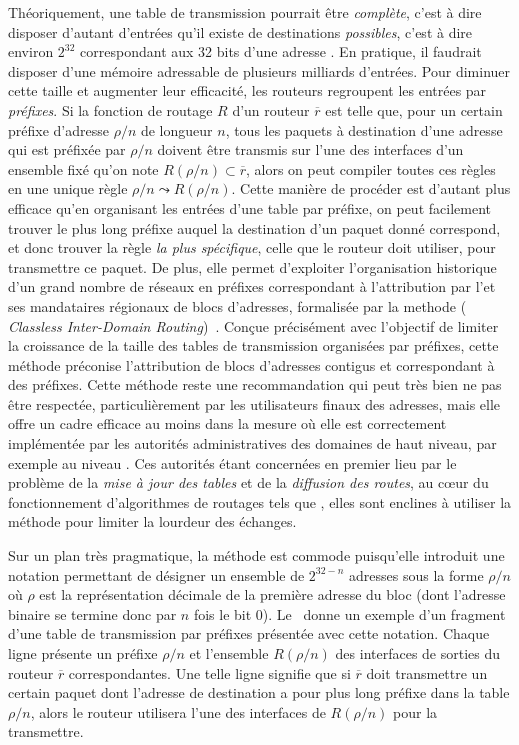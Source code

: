 Théoriquement, une table de transmission pourrait être {\em complète}, c'est à
dire disposer d'autant d'entrées qu'il existe de destinations {\em possibles},
c'est à dire environ $2^{32}$ correspondant aux 32 bits d'une adresse \ip. En
pratique, il faudrait disposer d'une mémoire adressable de plusieurs milliards
d'entrées. Pour diminuer cette taille et augmenter leur efficacité, les routeurs
regroupent les entrées par {\em préfixes}. Si la fonction de routage $R$ d'un
routeur $\overline{r}$ est telle que, pour un certain préfixe d'adresse $\rho/n$
de longueur $n$, tous les paquets à destination d'une adresse qui est préfixée
par $\rho/n$ doivent être transmis sur l'une des interfaces d'un ensemble fixé
qu'on note $R(\rho/n) \subset \overline{r}$, alors on peut compiler toutes ces
règles en une unique règle $\rho/n \leadsto R(\rho/n)$.
Cette manière de procéder est d'autant plus efficace qu'en organisant les
entrées d'une table par préfixe, on peut facilement trouver le plus long préfixe
auquel la destination d'un paquet donné correspond, et donc trouver la règle
{\em la plus spécifique}, celle que le routeur doit utiliser, pour transmettre
ce paquet. De plus, elle permet d'exploiter l'organisation historique d'un grand
nombre de réseaux en préfixes correspondant à l'attribution par l'\iana et ses
mandataires régionaux de blocs d'adresses, formalisée par la methode \cidr ({\em
Classless Inter-Domain Routing})~\cite{rfc1517,rfc1518,rfc1519,rfc4632}. Conçue
précisément avec l'objectif de limiter la croissance de la taille des tables de
transmission organisées par préfixes, cette méthode préconise l'attribution de
blocs d'adresses contigus et correspondant à des préfixes. Cette méthode reste
une recommandation qui peut très bien ne pas être respectée, particulièrement
par les utilisateurs finaux des adresses, mais elle offre un cadre efficace au
moins dans la mesure où elle est correctement implémentée par les autorités
administratives des domaines de haut niveau, par exemple au niveau \as. Ces
autorités étant concernées en premier lieu par le problème de la {\em mise à
jour des tables} et de la {\em diffusion des routes}, au c\oe{}ur du
fonctionnement d'algorithmes de routages tels que \bgp, elles sont enclines à
utiliser la méthode \cidr pour limiter la lourdeur des échanges.

Sur un plan très pragmatique, la méthode \cidr est commode puisqu'elle introduit
une notation permettant de désigner un ensemble de $2^{32 - n}$ adresses sous la
forme $\rho/n$ où $\rho$ est la représentation décimale de la première adresse du
bloc (dont l'adresse binaire se termine donc par $n$ fois le bit 0).
Le~ donne un exemple d'un fragment d'une table
de transmission par préfixes présentée avec cette notation. Chaque ligne
présente un préfixe $\rho/n$ et l'ensemble $R(\rho/n)$ des interfaces de sorties
du routeur $\overline{r}$ correspondantes. Une telle ligne signifie que si
$\overline{r}$ doit transmettre un certain paquet dont l'adresse de destination
a pour plus long préfixe dans la table $\rho/n$, alors le routeur utilisera
l'une des interfaces de $R(\rho/n)$ pour la transmettre.

